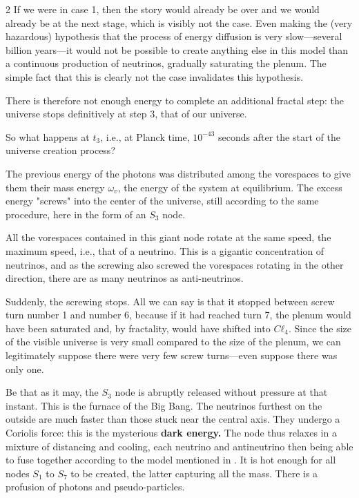 \begin{multicols}{2}
	If we were in case 1, then the story would already be over and we would already be at the next stage, which is visibly not the case. Even making the (very hazardous) hypothesis that the process of energy diffusion is very slow—several billion years—it would not be possible to create anything else in this model than a continuous production of neutrinos, gradually saturating the plenum. The simple fact that this is clearly not the case invalidates this hypothesis.
	
	There is therefore not enough energy to complete an additional fractal step: the universe stops definitively at step 3, that of our universe.
	
	So what happens at $t_3$, i.e., at Planck time, $10^{-43}$ seconds after the start of the universe creation process?
	
	The previous energy of the photons was distributed among the vorespaces to give them their mass energy $\omega_v$, the energy of the system at equilibrium. The excess energy "screws" into the center of the universe, still according to the same procedure, here in the form of an $S_3$ node.
	
	All the vorespaces contained in this giant node rotate at the same speed, the maximum speed, i.e., that of a neutrino. This is a gigantic concentration of neutrinos, and as the screwing also screwed the vorespaces rotating in the other direction, there are as many neutrinos as anti-neutrinos.
	
	Suddenly, the screwing stops. All we can say is that it stopped between screw turn number 1 and number 6, because if it had reached turn 7, the plenum would have been saturated and, by fractality, would have shifted into $Cℓ_4$. Since the size of the visible universe is very small compared to the size of the plenum, we can legitimately suppose there were very few screw turns—even suppose there was only one.
	
	Be that as it may, the $S_3$ node is abruptly released without pressure at that instant. This is the furnace of the Big Bang. The neutrinos furthest on the outside are much faster than those stuck near the central axis. They undergo a Coriolis force: this is the mysterious \textbf{dark energy.} The node thus relaxes in a mixture of distancing and cooling, each neutrino and antineutrino then being able to fuse together according to the model mentioned in \PQ. It is hot enough for all nodes $S_1$ to $S_7$ to be created, the latter capturing all the mass. There is a profusion of photons and pseudo-particles.
	

\end{multicols}
